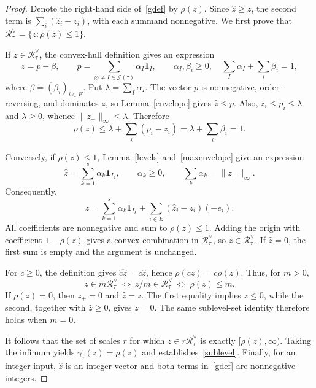 \documentclass[10pt,a4paper]{amsart}
\newcommand{\Rpoly}[1]{\mathcal R_{#1}^{\vee}}
\theoremstyle{plain}
\theoremstyle{definition}
\theoremstyle{remark}
\theoremstyle{definition}
\begin{document}
\begin{proof}
Denote the right-hand side of~\eqref{gdef} by $\rho(z)$. Since $\widehat z\ge z$, the second term is $\sum_i(\widehat z_i-z_i)$, with each summand nonnegative. We first prove that $\Rpoly{\tau}=\{z:\rho(z)\le1\}$.

If $z\in\Rpoly{\tau}$, the convex-hull definition gives an expression
\[
 z=p-\beta,\qquad
 p=\sum_{\varnothing\ne I\in\mathcal J(\tau)}\alpha_I\mathbf1_I,
 \qquad \alpha_I,\beta_i\ge0,\quad
 \sum_I\alpha_I+\sum_i\beta_i=1,
\]
where $\beta=(\beta_i)_{i\in E}$. Put $\lambda=\sum_I\alpha_I$. The vector $p$ is nonnegative, order-reversing, and dominates $z$, so Lemma~\ref{envelope} gives $\widehat z\le p$. Also, $z_i\le p_i\le\lambda$ and $\lambda\ge0$, whence $\|z_+\|_\infty\le\lambda$. Therefore
\[
 \rho(z)\le\lambda+\sum_i(p_i-z_i)
          =\lambda+\sum_i\beta_i=1.
\]

Conversely, if $\rho(z)\le1$, Lemma~\ref{levels} and~\eqref{maxenvelope} give an expression
\[
 \widehat z=\sum_{k=1}^s\alpha_k\mathbf1_{I_k},
 \qquad \alpha_k\ge0,\qquad
 \sum_k\alpha_k=\|z_+\|_\infty.
\]
Consequently,
\[
 z=\sum_{k=1}^s\alpha_k\mathbf1_{I_k}
       +\sum_{i\in E}(\widehat z_i-z_i)(-e_i).
\]
All coefficients are nonnegative and sum to $\rho(z)\le1$. Adding the origin with coefficient $1-\rho(z)$ gives a convex combination in $\Rpoly{\tau}$, so $z\in\Rpoly{\tau}$. If $\widehat z=0$, the first sum is empty and the argument is unchanged.

For $c\ge0$, the definition gives $\widehat{cz}=c\widehat z$, hence $\rho(cz)=c\rho(z)$. Thus, for $m>0$,
\[
 z\in m\Rpoly{\tau}
 \ \Longleftrightarrow\ z/m\in\Rpoly{\tau}
 \ \Longleftrightarrow\ \rho(z)\le m.
\]
If $\rho(z)=0$, then $z_+=0$ and $\widehat z=z$. The first equality implies $z\le0$, while the second, together with $\widehat z\ge0$, gives $z=0$. The same sublevel-set identity therefore holds when $m=0$.

It follows that the set of scales $r$ for which $z\in r\Rpoly{\tau}$ is exactly $[\rho(z),\infty)$. Taking the infimum yields $\gamma_\tau(z)=\rho(z)$ and establishes~\eqref{sublevel}. Finally, for an integer input, $\widehat z$ is an integer vector and both terms in~\eqref{gdef} are nonnegative integers.
\end{proof}
\end{document}
